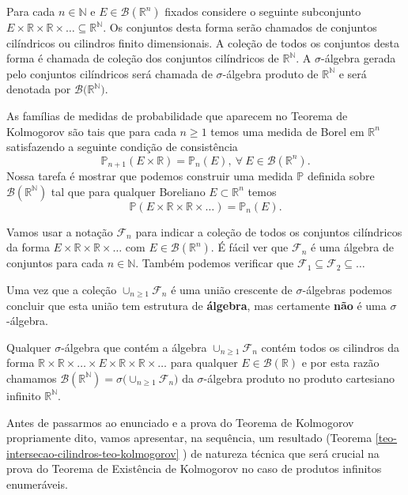 Para cada $n\in\mathbb{N}$ e $E\in\mathscr{B}(\mathbb{R}^n)$
fixados considere o seguinte subconjunto 
$
E\times\mathbb{R}\times\mathbb{R}\times\ldots 
\subseteq 
\mathbb{R}^{\mathbb{N}}.
$
Os conjuntos desta forma serão chamados de
conjuntos cilíndricos ou cilindros finito dimensionais.
A coleção de todos os conjuntos 
desta forma é chamada de coleção dos conjuntos cilíndricos
de $\mathbb{R}^{\mathbb{N}}$. A $\sigma$-álgebra gerada
pelo conjuntos cilíndricos será chamada de $\sigma$-álgebra
produto de $\mathbb{R}^{\mathbb{N}}$ e será denotada por 
$\mathscr{B}\big(\mathbb{R}^{\mathbb{N}}\big)$.

As famílias de medidas de probabilidade que aparecem 
no Teorema de Kolmogorov são tais que para cada $n\geq 1$
temos uma medida de Borel em $\mathbb{R}^n$ satisfazendo 
a seguinte condição de consistência 
\[
\mathbb{P}_{n+1}(E\times\mathbb{R}) = \mathbb{P}_n(E),
\ \forall \ E\in\mathscr{B}(\mathbb{R}^n).
\]
Nossa tarefa é mostrar que podemos 
construir uma medida $\mathbb{P}$ definida sobre 
$\mathscr{B}(\mathbb{R}^{\mathbb{N}})$ tal que 
para qualquer Boreliano $E\subset\mathbb{R}^n$ 
temos 
\[
\mathbb{P}(E\times\mathbb{R}\times\mathbb{R}\times\ldots)
=
\mathbb{P}_n(E).
\] 

Vamos usar a notação $\mathcal{F}_n$ para indicar 
a coleção de todos os conjuntos cilíndricos da 
forma $E\times\mathbb{R}\times\mathbb{R}\times\ldots$
com $E\in\mathscr{B}(\mathbb{R}^n)$. É fácil ver que
$\mathcal{F}_n$ é uma álgebra de conjuntos para 
cada $n\in\mathbb{N}$. Também podemos verificar que 
$\mathcal{F}_1\subseteq \mathcal{F}_2\subseteq \ldots$ 

Uma vez que a coleção $\cup_{n\geq 1}\mathcal{F}_n$ 
é uma união crescente de $\sigma$-álgebras podemos 
concluir que esta união tem estrutura de {\bf álgebra},
mas certamente {\bf não} é uma $\sigma$-álgebra.

Qualquer $\sigma$-álgebra que contém a álgebra
$\cup_{n\geq 1}\mathcal{F}_n$ contém todos os 
cilindros da forma 
$\mathbb{R}\times\mathbb{R}\times\ldots\times 
E\times\mathbb{R}\times\mathbb{R}\times\ldots$
para qualquer $E\in\mathscr{B}(\mathbb{R})$ 
e por esta razão chamamos 
$
\mathscr{B}(\mathbb{R}^{\mathbb{N}})
=
\sigma\big(\cup_{n\geq 1}\mathcal{F}_n \big)
$ 
da $\sigma$-álgebra
produto no produto cartesiano infinito $\mathbb{R}^{\mathbb{N}}$.

Antes de passarmos ao enunciado e a prova do Teorema de Kolmogorov
propriamente dito, vamos apresentar, 
na sequência, um resultado 
(Teorema \ref{teo-intersecao-cilindros-teo-kolmogorov} ) 
de natureza técnica que 
será crucial na prova do 
Teorema de Existência de Kolmogorov no caso de 
produtos infinitos enumeráveis. 


